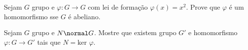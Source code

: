 \begin{exercise}
%

Sejam $G$ grupo e $\varphi: G \to G$ com lei de formação $\varphi(x) = x^2$. Prove que $\varphi$ é um homomorfismo sse $G$ é abeliano.
\end{exercise}

\begin{exercise}
Sejam $G$ grupo e $N \normal G$. Mostre que existem grupo $G'$ e homomorfismo $\varphi: G \to G'$ tais que $N = \text{ker }\varphi$.
\end{exercise}
